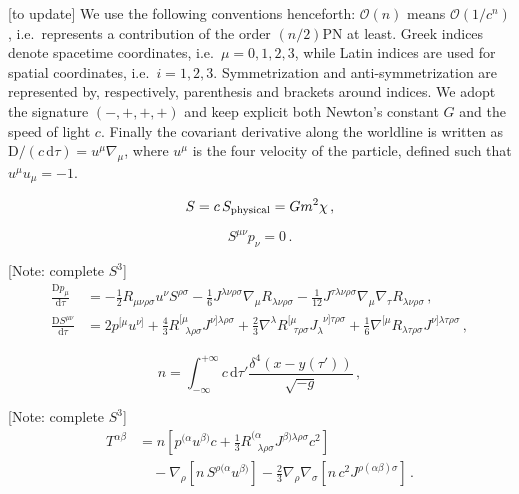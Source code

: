 \documentclass[
superscriptaddress,
preprint,
prd,tightenlines,showpacs,nofootinbib,
eqsecnum,
amsfonts,amsmath,amssymb]{revtex4-1}
\newcommand{\ud}{\mathrm{d}}
\newcommand{\uD}{\mathrm{D}}
\newcommand{\calO}{\mathcal{O}}
\newcommand{\ph}[1]{\phantom{#1}}
\newcommand{\be}{\begin{equation}}
\newcommand{\ee}{\end{equation}}
\newcommand{\nn}{\nonumber}
\begin{document}
[to update]
We use the following conventions henceforth: $\calO(n)$ means
$\calO(1/c^{n})$, i.e.\ represents a contribution of the order $(n/2)$PN at
least. Greek indices denote spacetime coordinates, i.e.\ $\mu = 0,1,2,3$,
while Latin indices are used for spatial coordinates, i.e.\ $i=1,2,3$.
Symmetrization and anti-symmetrization are represented by, respectively,
parenthesis and brackets around indices. We adopt the signature $(-,+,+,+)$
and keep explicit both Newton's constant $G$ and the speed of light $c$.
Finally the covariant derivative along the worldline is written as
$\uD/(c\,\ud \tau) = u^{\mu}\nabla_{\mu}$, where $u^{\mu}$ is the four
velocity of the particle, defined such that $u^{\mu}u_{\mu}=-1$.

\be
	S=c\, S_{\rm physical}=Gm^2\chi \,,
\ee 

\be\label{eq:ssc}
	S^{\mu\nu}p_{\nu} = 0\,.
\ee

[Note: complete $S^3$]
\begin{subequations} \label{eq:evolution}
\begin{align}
	\frac{\uD p_{\mu}}{\ud\tau} &= -\frac{1}{2}R_{\mu\nu\rho\sigma}u^{\nu}S^{\rho\sigma} - \frac{1}{6} J^{\lambda\nu\rho\sigma} \nabla_{\mu} R_{\lambda\nu\rho\sigma} - \frac{1}{12} J^{\tau\lambda\nu\rho\sigma}\nabla_{\mu}\nabla_{\tau}R_{\lambda\nu\rho\sigma}\,, \label{eq:dpdt} \\
  \frac{\uD S^{\mu\nu}}{\ud \tau} &= 2p^{[\mu}u^{\nu]} + \frac{4}{3} R^{[\mu}_{\ph{\mu}\lambda\rho\sigma}J^{\nu]\lambda\rho\sigma} + \frac{2}{3}\nabla^{\lambda}R^{[\mu}_{\ph{\mu}\tau\rho\sigma} J_{\lambda}^{\ph{\lambda}\nu]\tau\rho\sigma} + \frac{1}{6}\nabla^{[\mu}R_{\lambda\tau\rho\sigma} J^{\nu]\lambda\tau\rho\sigma} \,, \label{eq:dsdt}
\end{align}
\end{subequations}

\be \label{eq:scalar_density}
n = \int_{-\infty}^{+\infty} c\, \ud \tau'
\frac{\delta^{4}(x-y(\tau'))}{\sqrt{-g}} \, ,
\ee

[Note: complete $S^3$]
\begin{align}\label{eq:Tmunuquadrupole}
  T^{\alpha\beta} &= n \left[ p^{(\alpha}u^{\beta)} c +\frac{1}{3}
    R^{(\alpha}_{\ph{\alpha}\lambda\rho\sigma}J^{\beta)\lambda\rho\sigma}c^2 \right] \nn \\
  & \quad  - \nabla_{\rho} \left[n\, S^{\rho(\alpha}u^{\beta)} \right] - \frac{2}{3} 
  \nabla_{\rho}\nabla_{\sigma}  \left[ n\, c^2 J^{\rho(\alpha\beta)\sigma} \right]  \,.
\end{align}
\end{document}
